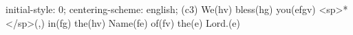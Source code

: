initial-style: 0;
centering-scheme: english;
(c3) We(hv) bless(hg) you(efgv) <sp>*</sp>(,) in(fg) the(hv) Name(fe) of(fv) the(e) Lord.(e)
